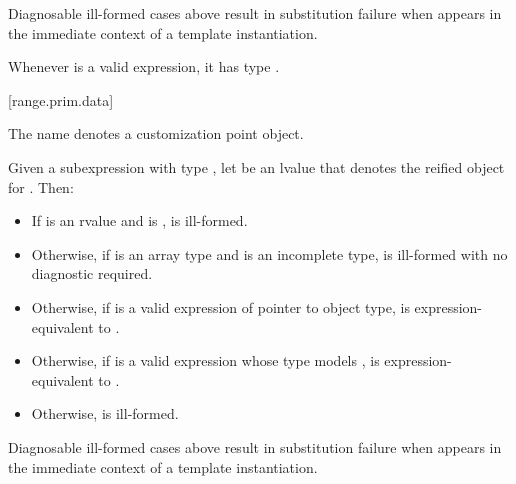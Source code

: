 \pnum
\begin{note}
Diagnosable ill-formed cases above
result in substitution failure when 
appears in the immediate context of a template instantiation.
\end{note}

\pnum
\begin{note}
Whenever  is a valid expression,
it has type .
\end{note}

[range.prim.data]{}
%

\pnum
The name  denotes a customization point
object.

\pnum
Given a subexpression  with type ,
let  be an lvalue that denotes the reified object for .
Then:
\begin{itemize}
\item
  If  is an rvalue and
   is ,
   is ill-formed.

\item
  Otherwise, if  is an array type and
   is an incomplete type,
   is ill-formed with no diagnostic required.

\item
  Otherwise, if 
  is a valid expression of pointer to object type,
   is expression-equivalent to
  .

\item
  Otherwise, if 
  is a valid expression whose type models
  ,
   is expression-equivalent to
  .

\item
  Otherwise,  is ill-formed.
\end{itemize}

\pnum
\begin{note}
Diagnosable ill-formed cases above
result in substitution failure when 
appears in the immediate context of a template instantiation.
\end{note}

